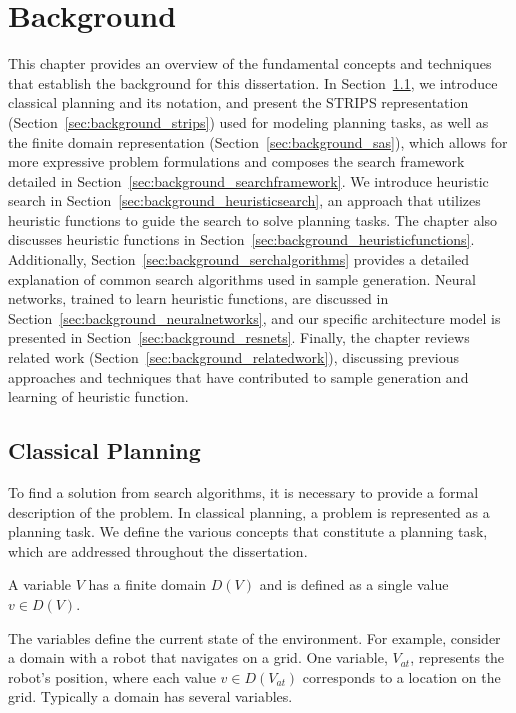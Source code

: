 \chapter{Background}\label{sec:preliminaries}

This chapter provides an overview of the fundamental concepts and techniques that establish the background for this dissertation. In Section~\ref{sec:background_classicalplanning}, we introduce classical planning and its notation, and present the STRIPS representation (Section~\ref{sec:background_strips}) used for modeling planning tasks, as well as the finite domain representation (Section~\ref{sec:background_sas}), which allows for more expressive problem formulations and composes the search framework detailed in Section~\ref{sec:background_searchframework}. We introduce heuristic search in Section~\ref{sec:background_heuristicsearch}, an approach that utilizes heuristic functions to guide the search to solve planning tasks. The chapter also discusses heuristic functions in Section~\ref{sec:background_heuristicfunctions}. Additionally, Section~\ref{sec:background_serchalgorithms} provides a detailed explanation of common search algorithms used in sample generation. Neural networks, trained to learn heuristic functions, are discussed in Section~\ref{sec:background_neuralnetworks}, and our specific architecture model is presented in Section~\ref{sec:background_resnets}. Finally, the chapter reviews related work (Section~\ref{sec:background_relatedwork}), discussing previous approaches and techniques that have contributed to sample generation and learning of heuristic function.

\section{Classical Planning}
\label{sec:background_classicalplanning}

To find a solution from search algorithms, it is necessary to provide a formal description of the problem. In classical planning, a problem is represented as a planning task. We define the various concepts that constitute a planning task, which are addressed throughout the dissertation.

\begin{definition}[Variable]\label{def:variable}
    A variable $V$ has a finite domain $D(V)$ and is defined as a single value $v \in D(V)$.
\end{definition}

The variables define the current state of the environment. For example, consider a domain with a robot that navigates on a grid. One variable, $V_{at}$, represents the robot's position, where each value $v \in D(V_{at})$ corresponds to a location on the grid. Typically a domain has several variables.

